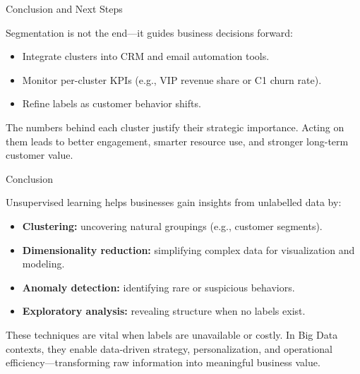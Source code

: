 \documentclass[aspectratio=169, table]{beamer}
\begin{document}
\begin{frame}{Conclusion and Next Steps}
\vspace{20pt}

Segmentation is not the end—it guides business decisions forward:

\begin{itemize}
\item Integrate clusters into CRM and email automation tools.
\item Monitor per-cluster KPIs (e.g., VIP revenue share or C1 churn rate).
\item Refine labels as customer behavior shifts.
\end{itemize}

The numbers behind each cluster justify their strategic importance. Acting on them leads to better engagement, smarter resource use, and stronger long-term customer value.
\end{frame}

\begin{frame}{Conclusion}
	\vspace{20pt}
	
	Unsupervised learning helps businesses gain insights from unlabelled data by:
	
	\begin{itemize}
		\item \textbf{Clustering:} uncovering natural groupings (e.g., customer segments).
		\item \textbf{Dimensionality reduction:} simplifying complex data for visualization and modeling.
		\item \textbf{Anomaly detection:} identifying rare or suspicious behaviors.
		\item \textbf{Exploratory analysis:} revealing structure when no labels exist.
	\end{itemize}
	
	These techniques are vital when labels are unavailable or costly. In Big Data contexts, they enable data-driven strategy, personalization, and operational efficiency—transforming raw information into meaningful business value.
\end{frame}
\end{document}
